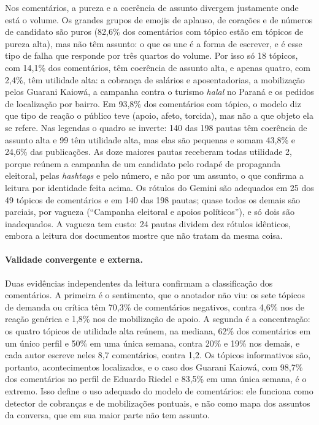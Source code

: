 Nos comentários, a pureza e a coerência de assunto divergem justamente onde está o volume. Os grandes grupos de emojis de aplauso, de corações e de números de candidato são puros (82,6\% dos comentários com tópico estão em tópicos de pureza alta), mas não têm assunto: o que os une é a forma de escrever, e é esse tipo de falha que responde por três quartos do volume. Por isso só 18 tópicos, com 14,1\% dos comentários, têm coerência de assunto alta, e apenas quatro, com 2,4\%, têm utilidade alta: a cobrança de salários e aposentadorias, a mobilização pelos Guarani Kaiowá, a campanha contra o turismo \emph{halal} no Paraná e os pedidos de localização por bairro. Em 93,8\% dos comentários com tópico, o modelo diz que tipo de reação o público teve (apoio, afeto, torcida), mas não a que objeto ela se refere. Nas legendas o quadro se inverte: 140 das 198 pautas têm coerência de assunto alta e 99 têm utilidade alta, mas elas são pequenas e somam 43,8\% e 24,6\% das publicações. As doze maiores pautas receberam todas utilidade 2, porque reúnem a campanha de um candidato pelo rodapé de propaganda eleitoral, pelas \emph{hashtags} e pelo número, e não por um assunto, o que confirma a leitura por identidade feita acima. Os rótulos do Gemini são adequados em 25 dos 49 tópicos de comentários e em 140 das 198 pautas; quase todos os demais são parciais, por vagueza (``Campanha eleitoral e apoios políticos''), e só dois são inadequados. A vagueza tem custo: 24 pautas dividem dez rótulos idênticos, embora a leitura dos documentos mostre que não tratam da mesma coisa.

\paragraph*{Validade convergente e externa.} Duas evidências independentes da leitura confirmam a classificação dos comentários. A primeira é o sentimento, que o anotador não viu: os sete tópicos de demanda ou crítica têm 70,3\% de comentários negativos, contra 4,6\% nos de reação genérica e 1,8\% nos de mobilização de apoio. A segunda é a concentração: os quatro tópicos de utilidade alta reúnem, na mediana, 62\% dos comentários em um único perfil e 50\% em uma única semana, contra 20\% e 19\% nos demais, e cada autor escreve neles 8,7 comentários, contra 1,2. Os tópicos informativos são, portanto, acontecimentos localizados, e o caso dos Guarani Kaiowá, com 98,7\% dos comentários no perfil de Eduardo Riedel e 83,5\% em uma única semana, é o extremo. Isso define o uso adequado do modelo de comentários: ele funciona como detector de cobranças e de mobilizações pontuais, e não como mapa dos assuntos da conversa, que em sua maior parte não tem assunto.

